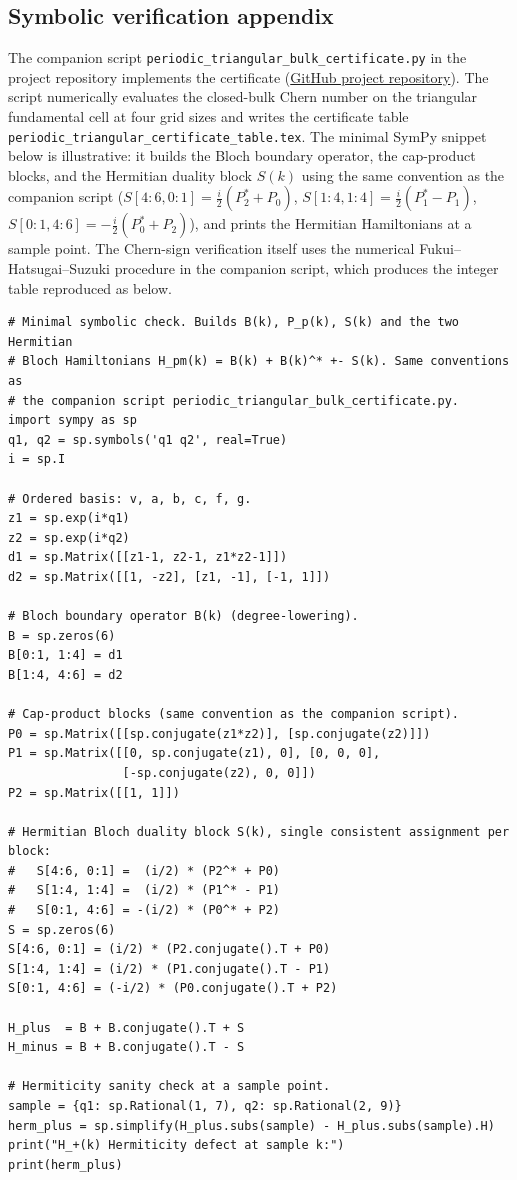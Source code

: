 \documentclass[11pt]{article}
\numberwithin{equation}{section}
\theoremstyle{definition}
\theoremstyle{remark}
\begin{document}
\subsection{Symbolic verification appendix}\label{app:symbolic_verification}
The companion script
\texttt{periodic\_triangular\_bulk\_certificate.py} in the project repository implements the certificate
(\href{https://github.com/yspennstate/Doubling-and-Jamming-A-Universal-Chern-Hamiltonian-on-Triangulated-Surfaces-with-Boundary}{GitHub project repository}).
The script numerically evaluates the closed-bulk Chern number on the triangular fundamental
cell at four grid sizes and writes the certificate table
\texttt{periodic\_triangular\_certificate\_table.tex}. The minimal SymPy snippet below is
illustrative: it builds the Bloch boundary operator, the cap-product blocks, and the
Hermitian duality block \(S(k)\) using the same convention as the companion script
(\(S[4:6,0:1]=\tfrac{i}{2}(P_2^*+P_0)\), \(S[1:4,1:4]=\tfrac{i}{2}(P_1^*-P_1)\),
\(S[0:1,4:6]=-\tfrac{i}{2}(P_0^*+P_2)\)), and prints the Hermitian Hamiltonians at a sample
point. The Chern-sign verification itself uses the numerical Fukui--Hatsugai--Suzuki
procedure in the companion script, which produces the integer table reproduced as
 below.
\begin{verbatim}
# Minimal symbolic check. Builds B(k), P_p(k), S(k) and the two Hermitian
# Bloch Hamiltonians H_pm(k) = B(k) + B(k)^* +- S(k). Same conventions as
# the companion script periodic_triangular_bulk_certificate.py.
import sympy as sp
q1, q2 = sp.symbols('q1 q2', real=True)
i = sp.I

# Ordered basis: v, a, b, c, f, g.
z1 = sp.exp(i*q1)
z2 = sp.exp(i*q2)
d1 = sp.Matrix([[z1-1, z2-1, z1*z2-1]])
d2 = sp.Matrix([[1, -z2], [z1, -1], [-1, 1]])

# Bloch boundary operator B(k) (degree-lowering).
B = sp.zeros(6)
B[0:1, 1:4] = d1
B[1:4, 4:6] = d2

# Cap-product blocks (same convention as the companion script).
P0 = sp.Matrix([[sp.conjugate(z1*z2)], [sp.conjugate(z2)]])
P1 = sp.Matrix([[0, sp.conjugate(z1), 0], [0, 0, 0],
                [-sp.conjugate(z2), 0, 0]])
P2 = sp.Matrix([[1, 1]])

# Hermitian Bloch duality block S(k), single consistent assignment per block:
#   S[4:6, 0:1] =  (i/2) * (P2^* + P0)
#   S[1:4, 1:4] =  (i/2) * (P1^* - P1)
#   S[0:1, 4:6] = -(i/2) * (P0^* + P2)
S = sp.zeros(6)
S[4:6, 0:1] = (i/2) * (P2.conjugate().T + P0)
S[1:4, 1:4] = (i/2) * (P1.conjugate().T - P1)
S[0:1, 4:6] = (-i/2) * (P0.conjugate().T + P2)

H_plus  = B + B.conjugate().T + S
H_minus = B + B.conjugate().T - S

# Hermiticity sanity check at a sample point.
sample = {q1: sp.Rational(1, 7), q2: sp.Rational(2, 9)}
herm_plus = sp.simplify(H_plus.subs(sample) - H_plus.subs(sample).H)
print("H_+(k) Hermiticity defect at sample k:")
print(herm_plus)
\end{verbatim}
\end{document}
